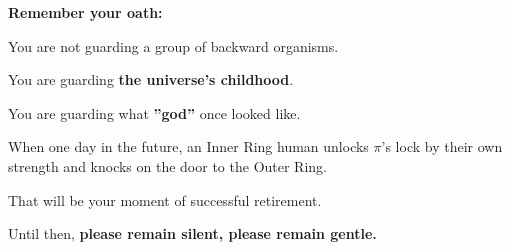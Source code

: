 \textbf{Remember your oath:}

You are not guarding a group of backward organisms.

You are guarding \textbf{the universe's childhood}.

You are guarding what \textbf{''god''} once looked like.

When one day in the future, an Inner Ring human unlocks $\pi$'s lock by their own strength and knocks on the door to the Outer Ring.

That will be your moment of successful retirement.

Until then, \textbf{please remain silent, please remain gentle.}

